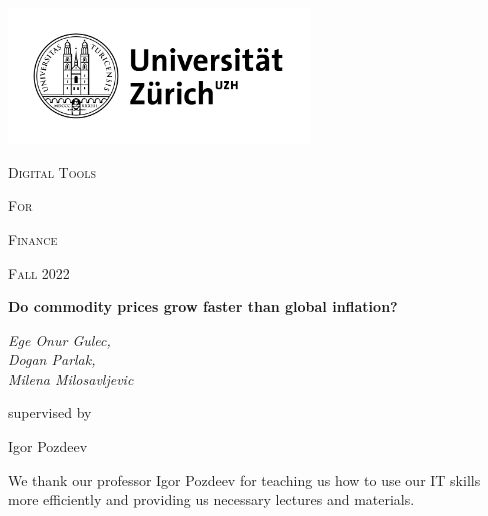 \documentclass{scrartcl}
\begin{document}
\begin{titlepage}
	\centering
	\includegraphics[width=0.6\textwidth]{Graphics/uzh_logo.png}\par
	\vspace{2cm}
	{\scshape\LARGE Digital Tools \par}  %
	{\scshape\LARGE For \par}                %
	{\scshape\LARGE Finance \par}      %
	\vspace{1cm}
	{\scshape\Large Fall 2022\par}
	\vfill
	
	{\huge\bfseries Do commodity prices grow faster than global inflation? \par}
	\vfill
	
	{\Large\itshape Ege Onur Gulec,\\ Dogan Parlak,\\ Milena Milosavljevic\\}\par
	\vspace{1.5cm}

	\vfill
	supervised by\par
        Igor Pozdeev


	\vfill
\end{titlepage}

\newpage



\vspace{1cm}

\begin{acknowledgements}
We thank our professor Igor Pozdeev for teaching us how to use our IT skills more efficiently and providing us necessary lectures and materials.
\end{acknowledgements}
\end{document}

